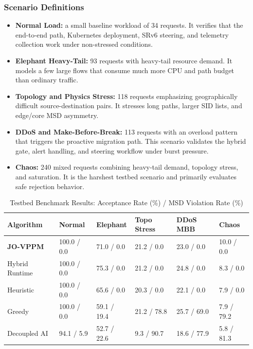 \documentclass[12pt, a4paper, reqno, oneside]{book}
\begin{document}
\subsubsection{Scenario Definitions}

\begin{itemize}
    \item \textbf{Normal Load:} a small baseline workload of 34 requests. It verifies that the end-to-end path, Kubernetes deployment, SRv6 steering, and telemetry collection work under non-stressed conditions.
    \item \textbf{Elephant Heavy-Tail:} 93 requests with heavy-tail resource demand. It models a few large flows that consume much more CPU and path budget than ordinary traffic.
    \item \textbf{Topology and Physics Stress:} 118 requests emphasizing geographically difficult source-destination pairs. It stresses long paths, larger SID lists, and edge/core MSD asymmetry.
    \item \textbf{DDoS and Make-Before-Break:} 113 requests with an overload pattern that triggers the proactive migration path. This scenario validates the hybrid gate, alert handling, and steering workflow under burst pressure.
    \item \textbf{Chaos:} 240 mixed requests combining heavy-tail demand, topology stress, and saturation. It is the harshest testbed scenario and primarily evaluates safe rejection behavior.
\end{itemize}

\begin{table}[H]
\centering
\caption{Testbed Benchmark Results: Acceptance Rate (\%) / MSD Violation Rate (\%)}
\label{table:testbed_scenarios}
\renewcommand{\arraystretch}{1.15}
\small
\begin{tabular}{l C{1.8cm} C{1.8cm} C{1.8cm} C{1.8cm} C{1.8cm}}
\toprule
\textbf{Algorithm} & \textbf{Normal} & \textbf{Elephant} & \textbf{Topo Stress} & \textbf{DDoS MBB} & \textbf{Chaos} \\
\midrule
\textbf{JO-VPPM}  & 100.0 / 0.0 & 71.0 / 0.0 & 21.2 / 0.0 & 23.0 / 0.0 & 10.0 / 0.0 \\
Hybrid Runtime    & 100.0 / 0.0 & 75.3 / 0.0 & 21.2 / 0.0 & 24.8 / 0.0 & 8.3 / 0.0 \\
Heuristic         & 100.0 / 0.0 & 65.6 / 0.0 & 20.3 / 0.0 & 22.1 / 0.0 & 7.9 / 0.0 \\
Greedy            & 100.0 / 0.0 & 59.1 / 19.4 & 21.2 / 78.8 & 25.7 / 69.0 & 7.9 / 79.2 \\
Decoupled AI      & 94.1 / 5.9  & 52.7 / 22.6 & 9.3 / 90.7  & 18.6 / 77.9 & 5.8 / 81.3 \\
\bottomrule
\end{tabular}
\end{table}
\end{document}
